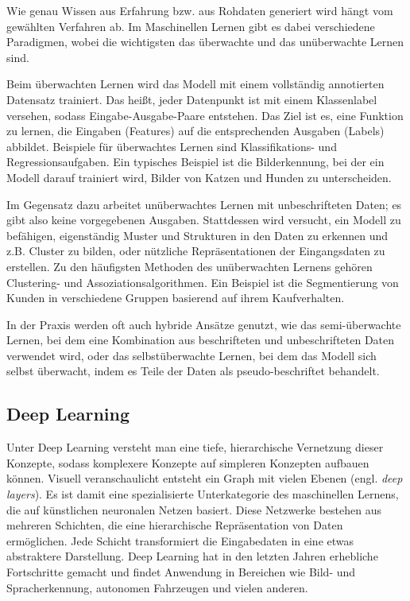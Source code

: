 Wie genau Wissen aus Erfahrung bzw. aus Rohdaten generiert wird hängt vom gewählten Verfahren ab. Im Maschinellen Lernen gibt es dabei verschiedene Paradigmen, wobei die wichtigsten das überwachte und das unüberwachte Lernen sind.

Beim überwachten Lernen wird das Modell mit einem vollständig annotierten Datensatz trainiert. Das heißt, jeder Datenpunkt ist mit einem Klassenlabel versehen, sodass Eingabe-Ausgabe-Paare entstehen. Das Ziel ist es, eine Funktion zu lernen, die Eingaben (Features) auf die entsprechenden Ausgaben (Labels) abbildet. Beispiele für überwachtes Lernen sind Klassifikations- und Regressionsaufgaben. Ein typisches Beispiel ist die Bilderkennung, bei der ein Modell darauf trainiert wird, Bilder von Katzen und Hunden zu unterscheiden.

Im Gegensatz dazu arbeitet unüberwachtes Lernen mit unbeschrifteten Daten; es gibt also keine vorgegebenen Ausgaben. Stattdessen wird versucht, ein Modell zu befähigen, eigenständig Muster und Strukturen in den Daten zu erkennen und z.B. Cluster zu bilden, oder nützliche Repräsentationen der Eingangsdaten zu erstellen. Zu den häufigsten Methoden des unüberwachten Lernens gehören Clustering- und Assoziationsalgorithmen. Ein Beispiel ist die Segmentierung von Kunden in verschiedene Gruppen basierend auf ihrem Kaufverhalten.

In der Praxis werden oft auch hybride Ansätze genutzt, wie das semi-überwachte Lernen, bei dem eine Kombination aus beschrifteten und unbeschrifteten Daten verwendet wird, oder das selbstüberwachte Lernen, bei dem das Modell sich selbst überwacht, indem es Teile der Daten als pseudo-beschriftet behandelt.

\subsection{Deep Learning}

Unter Deep Learning versteht man eine tiefe, hierarchische Vernetzung dieser Konzepte, sodass komplexere Konzepte auf simpleren Konzepten aufbauen können. Visuell veranschaulicht entsteht ein Graph mit vielen Ebenen (engl. \textit{deep layers}). Es ist damit eine spezialisierte Unterkategorie des maschinellen Lernens, die auf künstlichen neuronalen Netzen basiert. Diese Netzwerke bestehen aus mehreren Schichten, die eine hierarchische Repräsentation von Daten ermöglichen. Jede Schicht transformiert die Eingabedaten in eine etwas abstraktere Darstellung. Deep Learning hat in den letzten Jahren erhebliche Fortschritte gemacht und findet Anwendung in Bereichen wie Bild- und Spracherkennung, autonomen Fahrzeugen und vielen anderen.

